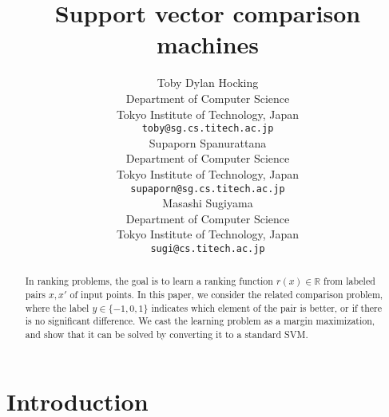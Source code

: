 \documentclass{article}
\newcommand{\RR}{\mathbb R}
\begin{document}
\nipsfinalcopy
\renewcommand{\arraystretch}{1.5}


\title{Support vector comparison machines}

\author{
Toby Dylan Hocking \\
Department of Computer Science\\
Tokyo Institute of Technology, Japan \\
\texttt{toby@sg.cs.titech.ac.jp} \\
\And
Supaporn Spanurattana \\
Department of Computer Science\\
Tokyo Institute of Technology, Japan \\
\texttt{supaporn@sg.cs.titech.ac.jp} \\
\And
Masashi Sugiyama \\
Department of Computer Science\\
Tokyo Institute of Technology, Japan \\
\texttt{sugi@cs.titech.ac.jp} 
}

\maketitle

\begin{abstract}
  In ranking problems, the goal is to learn a ranking function
  $r(x)\in\RR$ from labeled pairs $x,x'$ of input points. In this
  paper, we consider the related comparison problem, where the label
  $y\in\{-1,0,1\}$ indicates which element of the pair is better, or
  if there is no significant difference. We cast the learning problem
  as a margin maximization, and show that it can be solved by
  converting it to a standard SVM.
\end{abstract}

\section{Introduction}
\end{document}

